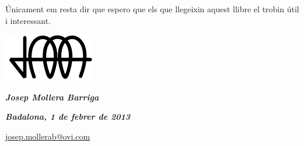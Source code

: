    \'{U}nicament em resta dir que espero que els que llegeixin aquest llibre el trobin
   \'{u}til i interessant.

\vspace*{1cm}
\hfill
\begin{minipage}[b]{25mm}
    \includegraphics{Imatges/Pre-Prefaci-JMB.pdf}
\end{minipage}

{\large

\hfill \textbf{\textsl{Josep Mollera Barriga}}

\hfill \textbf{\textsl{Badalona, 1 de febrer de 2013}}

\hfill \href{mailto:jmollerab@ya.com}{\Letter\hspace{2mm}josep.mollerab@ovi.com}

}
